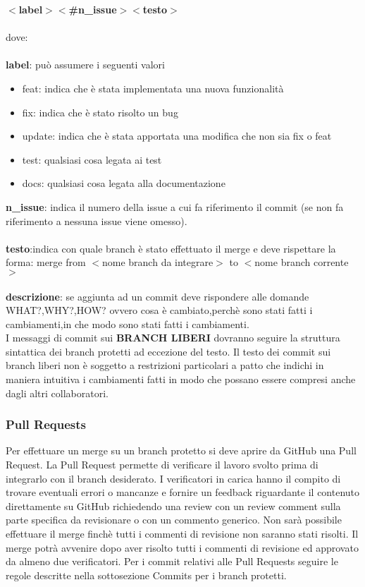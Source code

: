\textbf{$<$label$>$$<$\#n\_issue$>$$<$testo$>$}\\\\
dove:\\\\
\textbf{label}: può assumere i seguenti valori
\begin{itemize}
\item feat: indica che è stata implementata una nuova funzionalità
\item fix: indica che è stato risolto un bug
\item update: indica che è stata apportata una modifica che non sia fix o feat
\item test: qualsiasi cosa legata ai test
\item docs: qualsiasi cosa legata alla documentazione
\end{itemize}
\textbf{n\_issue}: indica il numero della issue a cui fa riferimento il commit (se non fa riferimento a nessuna issue viene omesso).\\\\
\textbf{testo}:indica con quale branch è stato effettuato il merge e deve rispettare la forma: merge from $<$nome branch da integrare$>$ to $<$nome branch corrente$>$ \\\\
\textbf{descrizione}: se aggiunta ad un commit deve rispondere alle domande WHAT?,WHY?,HOW? ovvero
cosa è cambiato,perchè sono stati fatti i cambiamenti,in che modo sono stati fatti i cambiamenti.\\

I messaggi di commit sui \textbf{\uppercase{branch liberi}} dovranno seguire la struttura sintattica dei branch protetti ad eccezione del testo.
Il testo dei commit sui branch liberi non è soggetto a restrizioni particolari a patto che indichi in maniera intuitiva i cambiamenti fatti
in modo che possano essere compresi anche dagli altri collaboratori.



\subsubsection{Pull Requests}
Per effettuare un merge su un branch protetto si deve aprire da GitHub una Pull Request.
La Pull Request permette di verificare il lavoro svolto prima di integrarlo con il branch desiderato.
I verificatori in carica hanno il compito di trovare eventuali errori o mancanze e fornire un feedback riguardante il contenuto direttamente su GitHub richiedendo
una review con un review comment sulla parte specifica da revisionare o con un commento generico.
Non sarà possibile effettuare il merge finchè tutti i commenti di revisione non saranno stati risolti.
Il merge potrà avvenire dopo aver risolto tutti i commenti di revisione ed approvato da almeno due verificatori.
Per i commit relativi alle Pull Requests seguire le regole descritte nella sottosezione Commits per i branch protetti.
